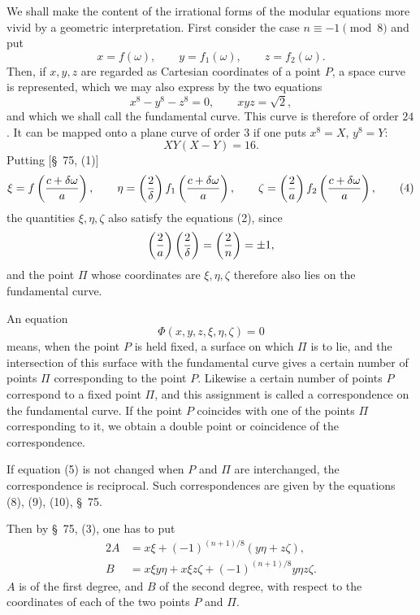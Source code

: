 \documentclass[11pt]{article}
\begin{document}
We shall make the content of the irrational forms of the modular equations more vivid by a geometric interpretation. First consider the case $n\equiv -1\pmod 8$ and put
\begin{equation}
 x=f(\omega),\qquad y=f_1(\omega),\qquad z=f_2(\omega).
\tag{1}
\end{equation}
Then, if $x,y,z$ are regarded as Cartesian coordinates of a point $P$, a space curve is represented, which we may also express by the two equations
\begin{equation}
 x^8-y^8-z^8=0,
 \qquad
 xyz=\sqrt{2},
\tag{2}
\end{equation}
and which we shall call the fundamental curve. This curve is therefore of order $24$. It can be mapped onto a plane curve of order $3$ if one puts $x^8=X$, $y^8=Y$:
\begin{equation}
 XY(X-Y)=16.
\tag{3}
\end{equation}
Putting [\S~75, (1)]
\begin{equation}
 \xi=f\left({c+\delta\omega\over a}\right),\qquad
 \eta=\left({2\over\delta}\right)f_1\left({c+\delta\omega\over a}\right),\qquad
 \zeta=\left({2\over a}\right)f_2\left({c+\delta\omega\over a}\right),
\tag{4}
\end{equation}
the quantities $\xi,\eta,\zeta$ also satisfy the equations (2), since
\[
 \left({2\over a}\right)\left({2\over\delta}\right)=\left({2\over n}\right)=\pm1,
\]
and the point $\Pi$ whose coordinates are $\xi,\eta,\zeta$ therefore also lies on the fundamental curve.

An equation
\[
 \Phi(x,y,z,\xi,\eta,\zeta)=0
\]
means, when the point $P$ is held fixed, a surface on which $\Pi$ is to lie, and the intersection of this surface with the fundamental curve gives a certain number of points $\Pi$ corresponding to the point $P$. Likewise a certain number of points $P$ correspond to a fixed point $\Pi$, and this assignment is called a correspondence on the fundamental curve. If the point $P$ coincides with one of the points $\Pi$ corresponding to it, we obtain a double point or coincidence of the correspondence.

If equation (5) is not changed when $P$ and $\Pi$ are interchanged, the correspondence is reciprocal. Such correspondences are given by the equations (8), (9), (10), \S~75.

Then by \S~75, (3), one has to put
\begin{equation}
\begin{aligned}
2A&=x\xi+(-1)^{(n+1)/8}(y\eta+z\zeta),\\
B&=x\xi y\eta+x\xi z\zeta+(-1)^{(n+1)/8}y\eta z\zeta.
\end{aligned}
\tag{5}
\end{equation}
$A$ is of the first degree, and $B$ of the second degree, with respect to the coordinates of each of the two points $P$ and $\Pi$.
\end{document}

